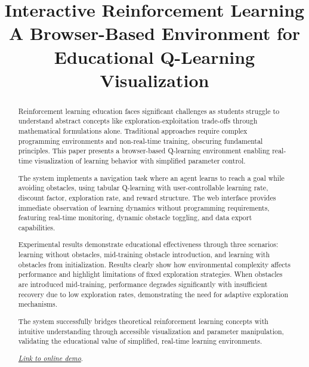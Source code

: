 \documentclass[conference]{IEEEtran}
\begin{document}
\title{Interactive Reinforcement Learning\\
{\footnotesize A Browser-Based Environment for Educational Q-Learning Visualization}
}

\author{
}

\maketitle

\begin{abstract}
Reinforcement learning education faces significant challenges as students struggle to understand abstract concepts like exploration-exploitation trade-offs through mathematical formulations alone. Traditional approaches require complex programming environments and non-real-time training, obscuring fundamental principles. This paper presents a browser-based Q-learning environment enabling real-time visualization of learning behavior with simplified parameter control.

The system implements a navigation task where an agent learns to reach a goal while avoiding obstacles, using tabular Q-learning with user-controllable learning rate, discount factor, exploration rate, and reward structure. The web interface provides immediate observation of learning dynamics without programming requirements, featuring real-time monitoring, dynamic obstacle toggling, and data export capabilities.

Experimental results demonstrate educational effectiveness through three scenarios: learning without obstacles, mid-training obstacle introduction, and learning with obstacles from initialization. Results clearly show how environmental complexity affects performance and highlight limitations of fixed exploration strategies. When obstacles are introduced mid-training, performance degrades significantly with insufficient recovery due to low exploration rates, demonstrating the need for adaptive exploration mechanisms.

The system successfully bridges theoretical reinforcement learning concepts with intuitive understanding through accessible visualization and parameter manipulation, validating the educational value of simplified, real-time learning environments.

\href{https://jakobjgarde.github.io/reinforced/}{\color{blue}\textit{Link to online demo}}.
\end{abstract}









\end{document}
